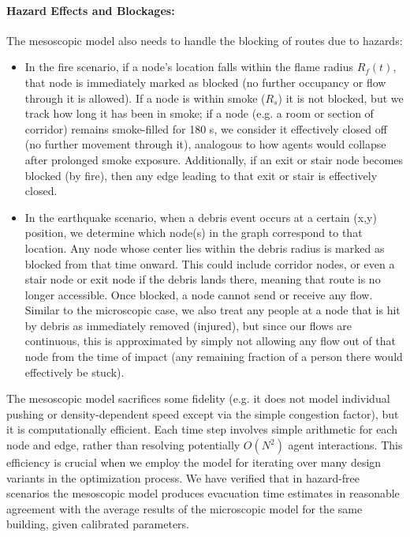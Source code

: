 \documentclass[11pt,a4paper]{article}
\begin{document}
\paragraph{Hazard Effects and Blockages:} The mesoscopic model also needs to handle the blocking of routes due to hazards:
\begin{itemize}
    \item In the fire scenario, if a node's location falls within the flame radius $R_f(t)$, that node is immediately marked as blocked (no further occupancy or flow through it is allowed). If a node is within smoke ($R_s$) it is not blocked, but we track how long it has been in smoke; if a node (e.g. a room or section of corridor) remains smoke-filled for 180 s, we consider it effectively closed off (no further movement through it), analogous to how agents would collapse after prolonged smoke exposure. Additionally, if an exit or stair node becomes blocked (by fire), then any edge leading to that exit or stair is effectively closed.
    \item In the earthquake scenario, when a debris event occurs at a certain (x,y) position, we determine which node(s) in the graph correspond to that location. Any node whose center lies within the debris radius is marked as blocked from that time onward. This could include corridor nodes, or even a stair node or exit node if the debris lands there, meaning that route is no longer accessible. Once blocked, a node cannot send or receive any flow. Similar to the microscopic case, we also treat any people at a node that is hit by debris as immediately removed (injured), but since our flows are continuous, this is approximated by simply not allowing any flow out of that node from the time of impact (any remaining fraction of a person there would effectively be stuck).
\end{itemize}

The mesoscopic model sacrifices some fidelity (e.g. it does not model individual pushing or density-dependent speed except via the simple congestion factor), but it is computationally efficient. Each time step involves simple arithmetic for each node and edge, rather than resolving potentially $O(N^2)$ agent interactions. This efficiency is crucial when we employ the model for iterating over many design variants in the optimization process. We have verified that in hazard-free scenarios the mesoscopic model produces evacuation time estimates in reasonable agreement with the average results of the microscopic model for the same building, given calibrated parameters.
\end{document}
